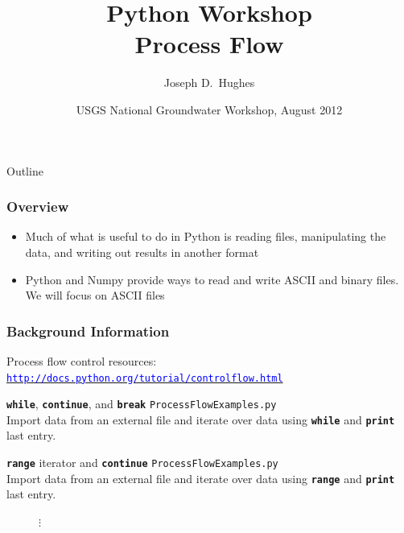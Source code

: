 \documentclass[t]{beamer}
\title[]{Python Workshop\\
Process Flow}
\author[Hughes] %
{Joseph D.~Hughes}
\institute[USGS] %
{
  U.S. Geological Survey\\
  Florida Water Science Center, Tampa, Florida USA
  }
\date[UQ12] %
{USGS National Groundwater Workshop, August 2012}
\begin{document}
\begin{frame}
  \titlepage
\end{frame}

\begin{frame}{Outline}
\tableofcontents
\end{frame}

\begin{frame}[fragile]
\frametitle{Overview}
\begin{itemize}

\item Much of what is useful to do in Python is reading files, manipulating the data, and writing out results in another format
\item Python and Numpy provide ways to read and write ASCII and binary files. We will focus on ASCII files
\end{itemize}
\end{frame}

\begin{frame}[fragile]
\frametitle{Background Information}
Process flow control resources: \\
\href{http://docs.python.org/tutorial/controlflow.html}{\texttt{\small{\textcolor{blue}{http://docs.python.org/tutorial/controlflow.html}}}}
\end{frame}

\begin{frame}{\texttt{\textbf{while}}, \texttt{\textbf{continue}}, and \texttt{\textbf{break}}}
\texttt{ProcessFlowExamples.py} \\ Import data from an external file and iterate over data using \texttt{\textbf{while}} and \texttt{\textbf{print}} last entry.
  \begin{figure}[ht]
  \centering
        \lstset{numbers=left}
        
   \end{figure}
\end{frame}

\begin{frame}{\texttt{\textbf{range}} iterator and \texttt{\textbf{continue}}}
\texttt{ProcessFlowExamples.py} \\ Import data from an external file and iterate over data using \texttt{\textbf{range}}  and \texttt{\textbf{print}}  last entry.
  \begin{figure}[ht]
  \centering
        \lstset{numbers=left}
        
       $\vdots$
        
   \end{figure}
\end{frame}
\end{document}
